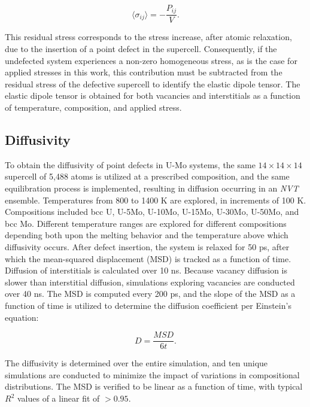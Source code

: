 \documentclass[review]{elsarticle}
\begin{document}
\begin{equation}\label{eq:dipole2}
    \langle \sigma_{ij} \rangle = - \frac{P_{ij}}{V}.
\end{equation}

This residual stress corresponds to the stress increase, after atomic relaxation, due to the insertion of a point defect in the supercell. Consequently, if the undefected system experiences a non-zero homogeneous stress, as is the case for applied stresses in this work, this contribution must be subtracted from the residual stress of the defective supercell to identify the elastic dipole tensor. The elastic dipole tensor is obtained for both vacancies and interstitials as a function of temperature, composition, and applied stress.




\subsection{Diffusivity}

To obtain the diffusivity of point defects in U-Mo systems, the same $14 \times 14 \times 14$ supercell of 5,488 atoms is utilized at a prescribed composition, and the same equilibration process is implemented, resulting in diffusion occurring in an \textit{NVT} ensemble. Temperatures from 800 to 1400 K are explored, in increments of 100 K. Compositions included bcc U, U-5Mo, U-10Mo, U-15Mo, U-30Mo, U-50Mo, and bcc Mo. Different temperature ranges are explored for different compositions depending both upon the melting behavior and the temperature above which diffusivity occurs. After defect insertion, the system is relaxed for 50 ps, after which the mean-squared displacement (MSD) is tracked as a function of time. Diffusion of interstitials is calculated over 10 ns. Because vacancy diffusion is slower than interstitial diffusion, simulations exploring vacancies are conducted over 40 ns. The MSD is computed every 200 ps, and the slope of the MSD as a function of time is utilized to determine the diffusion coefficient per Einstein's equation:

\begin{equation}
    D = \frac{MSD}{6t}.
\end{equation}

\noindent The diffusivity is determined over the entire simulation, and ten unique simulations are conducted to minimize the impact of variations in compositional distributions. The MSD is verified to be linear as a function of time, with typical $R^2$ values of a linear fit of $> 0.95$.
\end{document}
